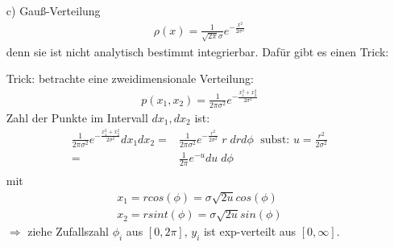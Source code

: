 \documentclass[12pt]{article}
\begin{document}
\begin{itemize}
 Beispiel: \begin{align}
  \rho(y)=
 \begin{cases}
e^{-y} & \text{für } y \geq 0 \\
0 & \text{für } y < 0.
 \end{cases}
 \end{align}
 
 \begin{enumerate}
 \item \begin{align*}
 \int_0^y dy' \rho(y') = 1_ e^{-y} =x(y)
 \end{align*}
 \item Umkehrfunktion:
  \begin{align*}
 y= - ln(1-x) = f(x)
 \end{align*}
 $\Rightarrow$ ziehe gleichverteilte Zufallszahl $x_i \in [0,1)$ (nicht die 1 selber!) \\
 $\Rightarrow y_i = -ln(1-x_i)$ sin exponentiell verteilte Zufallszahlen $\in [0,\infty]$.
 \end{enumerate}
 Nachteil: 
(Der Computer ist nicht so schnell beim logarithmieren...deswegen ist die rejection Methode diesbezüglich interessanter.) 
Man muss aber vor allem die gewünschte Verteilung $\rho(y)$ erst integrieren und dann invertieren können. Dies geht beispielsweise nicht bei:

\item[c)] Gauß-Verteilung
\begin{align*}
\rho(x)= \frac{1}{\sqrt{2 \pi} \sigma} e^{-\frac{x^2}{2 \sigma^2}}
\end{align*}
denn sie ist nicht analytisch bestimmt integrierbar. Dafür gibt es einen Trick:

Trick: betrachte eine zweidimensionale Verteilung:
\begin{align*}
p(x_1,x_2)=\frac{1}{	2 \pi \sigma^2} e^{- \frac{x_1^2 + x_2^2}{2 \sigma^2}}
\end{align*}
Zahl der Punkte im Intervall $dx_1, dx_2$ ist:
\begin{align*}
\frac{1}{	2 \pi \sigma^2} e^{- \frac{x_1^2 + x_2^2}{2 \sigma^2}} dx_1 dx_2= & \frac{1}{	2 \pi \sigma^2} e^{- \frac{r^2}{2 \sigma^2}} \;r \; dr  d\phi \; \mbox{  subst: } u = \frac{r^2}{2 \sigma^2}\\
= & \frac{1}{2 \pi} e^{-u} du \; d\phi \\
\end{align*}
mit
\begin{align*}
x_1=  r cos(\phi) = \sigma \sqrt{2 u} cos(\phi) \\
x_2=  r sint(\phi)= \sigma \sqrt{2 u} sin(\phi)
\end{align*}
$\Rightarrow$ ziehe Zufallszahl $\phi_i$ aus $[0,2\pi]$, $y_i$ ist exp-verteilt aus $[0, \infty]$.


\end{itemize}
\end{document}
